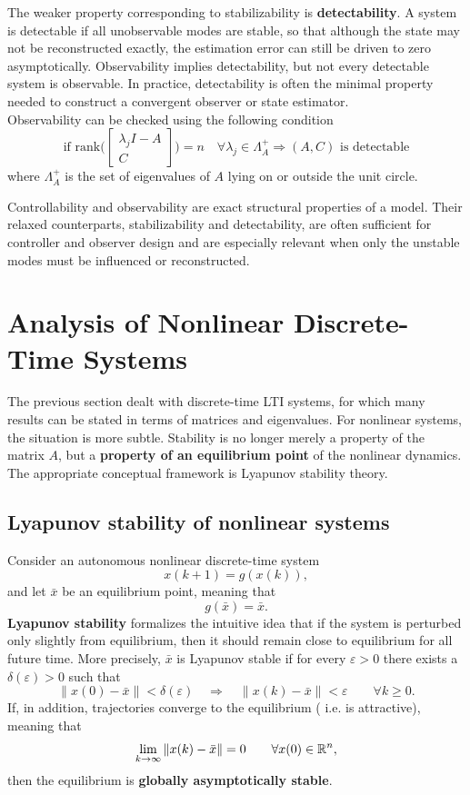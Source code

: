The weaker property corresponding to stabilizability is \textbf{detectability}. A system is detectable if all unobservable modes are stable, so that although the state may not be reconstructed exactly, the estimation error can still be driven to zero asymptotically. Observability implies detectability, but not every detectable system is observable. In practice, detectability is often the minimal property needed to construct a convergent observer or state estimator.\\
Observability can be checked using the following condition
$$\text{if rank} \biggl(\begin{bmatrix}\lambda_j I - A \\ C \end{bmatrix}\biggr) = n \quad \forall \lambda_j \in \Lambda_A^+ \Rightarrow (A,C) \text{ is detectable}$$
where $\Lambda_A^+$ is the set of eigenvalues of $A$ lying on or outside the unit circle.

\begin{theorembox}
Controllability and observability are exact structural properties of a model. Their relaxed counterparts, stabilizability and detectability, are often sufficient for controller and observer design and are especially relevant when only the unstable modes must be influenced or reconstructed.
\end{theorembox}

\section{Analysis of Nonlinear Discrete-Time Systems}

The previous section dealt with discrete-time LTI systems, for which many results can be stated in terms of matrices and eigenvalues. For nonlinear systems, the situation is more subtle. Stability is no longer merely a property of the matrix $A$, but a \textbf{property of an equilibrium point} of the nonlinear dynamics. The appropriate conceptual framework is Lyapunov stability theory.

\subsection{Lyapunov stability of nonlinear systems}

Consider an autonomous nonlinear discrete-time system
\[
x(k+1)=g(x(k)),
\]
and let $\bar{x}$ be an equilibrium point, meaning that
\[
g(\bar{x})=\bar{x}.
\]
\textbf{Lyapunov stability} formalizes the intuitive idea that if the system is perturbed only slightly from equilibrium, then it should remain close to equilibrium for all future time. More precisely, $\bar{x}$ is Lyapunov stable if for every $\varepsilon>0$ there exists a $\delta(\varepsilon)>0$ such that
\[
\|x(0)-\bar{x}\|<\delta(\varepsilon)
\quad\Longrightarrow\quad
\|x(k)-\bar{x}\|<\varepsilon \qquad \forall k\ge 0.
\]
If, in addition, trajectories converge to the equilibrium ( i.e. is attractive), meaning that
\[
\lim_{k\to\infty}\|x(k)-\bar{x}\|=0
\qquad \forall x(0)\in \mathbb{R}^n,
\]
then the equilibrium is \textbf{globally asymptotically stable}.
